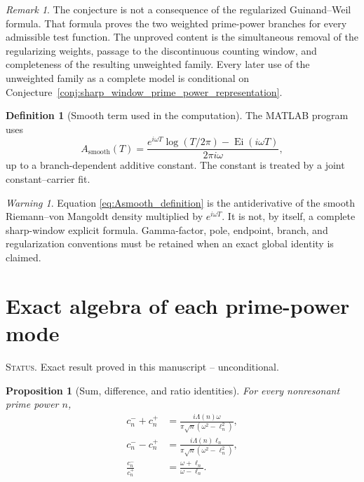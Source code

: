 \documentclass[11pt]{amsart}
\numberwithin{equation}{section}
\theoremstyle{plain}
\newtheorem{proposition}[theorem]{Proposition}
\theoremstyle{definition}
\newtheorem{definition}[theorem]{Definition}
\theoremstyle{remark}
\newtheorem{remark}[theorem]{Remark}
\newtheorem{warning}[theorem]{Warning}
\DeclareMathOperator{\Ei}{Ei}
\newcommand{\1}{\mathbf{1}}
\newcommand{\statusnote}[1]{%
  \par\smallskip\noindent
  \begingroup\footnotesize\textsc{Status.} #1\endgroup
  \par\smallskip}
\begin{document}
\begin{remark}
\label{rem:sharp_conjecture_status}
The conjecture is not a consequence of the regularized Guinand--Weil formula.
That formula proves the two weighted prime-power branches for every admissible
test function.  The unproved content is the simultaneous removal of the
regularizing weights, passage to the discontinuous counting window, and
completeness of the resulting unweighted family.  Every later use of the
unweighted family as a complete model is conditional on
Conjecture~\ref{conj:sharp_window_prime_power_representation}.
\end{remark}

\begin{definition}[Smooth term used in the computation]
\label{def:Asmooth}
The MATLAB program uses
\begin{equation}
A_{\mathrm{smooth}}(T)
=
\frac{
e^{i\omega T}\log(T/2\pi)-\Ei(i\omega T)
}{
2\pi i\omega
},
\label{eq:Asmooth_definition}
\end{equation}
up to a branch-dependent additive constant.  The constant is treated by
a joint constant--carrier fit.
\end{definition}

\begin{warning}
\label{warn:Asmooth_status}
Equation \eqref{eq:Asmooth_definition} is the antiderivative of the
smooth Riemann--von Mangoldt density multiplied by \(e^{i\omega T}\).
It is not, by itself, a complete sharp-window explicit formula.
Gamma-factor, pole, endpoint, branch, and regularization conventions must
be retained when an exact global identity is claimed.
\end{warning}

\section{Exact algebra of each prime-power mode}
\label{sec:mode_algebra}

\statusnote{Exact result proved in this manuscript -- unconditional.}
\begin{proposition}[Sum, difference, and ratio identities]
\label{prop:coefficient_identities}
For every nonresonant prime power \(n\),
\begin{align}
c_n^-+c_n^+
&=
\frac{i\Lambda(n)\omega}
{\pi\sqrt n(\omega^2-\ell_n^2)},
\label{eq:coefficient_sum}
\\
c_n^--c_n^+
&=
\frac{i\Lambda(n)\ell_n}
{\pi\sqrt n(\omega^2-\ell_n^2)},
\label{eq:coefficient_difference}
\\
\frac{c_n^-}{c_n^+}
&=
\frac{\omega+\ell_n}{\omega-\ell_n}.
\label{eq:coefficient_ratio}
\end{align}
\end{proposition}
\end{document}
